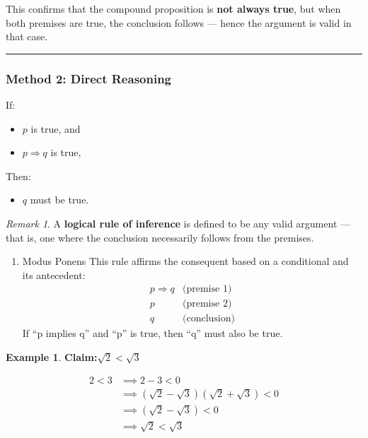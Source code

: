 \documentclass[
]{book}
\providecommand{\tightlist}{%
  \setlength{\itemsep}{0pt}\setlength{\parskip}{0pt}}
\theoremstyle{definition}
\theoremstyle{definition}
\newtheorem{example}{Example}[chapter]
\theoremstyle{definition}
\theoremstyle{definition}
\theoremstyle{remark}
\newtheorem*{remark}{Remark}
\begin{document}
This confirms that the compound proposition is \textbf{not always true}, but when both premises are true, the conclusion follows --- hence the argument is valid in that case.

\begin{center}\rule{0.5\linewidth}{0.5pt}\end{center}

\subsubsection{Method 2: Direct Reasoning}\label{method-2-direct-reasoning}

If:

\begin{itemize}
\tightlist
\item
  \(p\) is true, and
\item
  \(p \Rightarrow q\) is true,
\end{itemize}

Then:

\begin{itemize}
\tightlist
\item
  \(q\) must be true.
\end{itemize}

\begin{remark}
A \textbf{logical rule of inference} is defined to be any valid argument --- that is, one where the conclusion necessarily follows from the premises.
\end{remark}

\begin{enumerate}
\def\labelenumi{(\roman{enumi})}
\tightlist
\item
  Modus Ponens
  This rule affirms the consequent based on a conditional and its antecedent:
  \[
  \begin{array}{ll}
  p \Rightarrow q & \text{(premise 1)} \\
  p & \text{(premise 2)} \\
  \hline
  q & \text{(conclusion)}
  \end{array}
  \]
  If ``p implies q'' and ``p'' is true, then ``q'' must also be true.
\end{enumerate}

\begin{example}
\protect\hypertarget{exm:unnamed-chunk-61}{}\label{exm:unnamed-chunk-61}\textbf{Claim:}\(\sqrt{2} < \sqrt{3}\)

\begin{align}
  2<3 & \implies 2-3<0\\
  & \implies  (\sqrt{2} - \sqrt{3})(\sqrt{2} + \sqrt{3})<0\\
  &\implies (\sqrt{2} - \sqrt{3})<0\\
  & \implies \sqrt{2}  < \sqrt{3}                                     \end{align}
\end{example}
\end{document}
